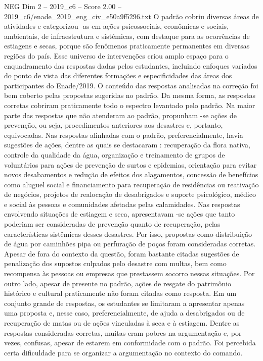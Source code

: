 \begin{textsample}{NEG Dim 2 – 2019\_c6 – Score 2.00 – 2019\_c6/enade\_2019\_eng\_civ\_e50a9f5296.txt}
O padrão cobriu diversas áreas de atividades e categorizou -as em ações psicossociais, econômicas e sociais, ambientais, de infraestrutura e sistêmicas, com destaque para as ocorrências de estiagens e secas, porque são fenômenos praticamente permanentes em diversas regiões do país.
Esse universo de intervenções criou amplo espaço para o enquadramento das respostas dadas pelos estudantes, incluindo enfoques variados do ponto de vista das diferentes formações e especificidades das áreas dos participantes do Enade/2019.
O conteúdo das respostas analisadas na correção foi bem coberto pelas propostas sugeridas no padrão.
Da mesma forma, as respostas corretas cobriram praticamente todo o espectro levantado pelo padrão.
Na maior parte das respostas que não atenderam ao padrão, propunham -se ações de prevenção, ou seja, procedimentos anteriores aos desastres e, portanto, equivocadas.
Nas respostas alinhadas com o padrão, preferencialmente, havia sugestões de ações, dentre as quais se destacaram : recuperação da flora nativa, controle da qualidade da água, organização e treinamento de grupos de voluntários para ações de prevenção de surtos e epidemias, orientação para evitar novos desabamentos e redução de efeitos dos alagamentos, concessão de benefícios como aluguel social e financiamento para recuperação de residências ou reativação de negócios, projetos de realocação de desabrigados e suporte psicológico, médico e social às pessoas e comunidades afetadas pelas calamidades.
Nas respostas envolvendo situações de estiagem e seca, apresentavam -se ações que tanto poderiam ser consideradas de prevenção quanto de recuperação, pelas características sistêmicas desses desastres.
Por isso, propostas como distribuição de água por caminhões pipa ou perfuração de poços foram consideradas corretas.
Apesar de fora do contexto da questão, foram bastante citadas sugestões de penalização dos supostos culpados pelo desastre com multas, bem como recompensa às pessoas ou empresas que prestassem socorro nessas situações.
Por outro lado, apesar de presente no padrão, ações de resgate do patrimônio histórico e cultural praticamente não foram citadas como resposta.
Em um conjunto grande de respostas, os estudantes se limitaram a apresentar apenas uma proposta e, nesse caso, preferencialmente, de ajuda a desabrigados ou de recuperação de matas ou de ações vinculadas à seca e à estiagem.
Dentre as respostas consideradas corretas, muitas eram pobres na argumentação e, por vezes, confusas, apesar de estarem em conformidade com o padrão.
Foi percebida certa dificuldade para se organizar a argumentação no contexto do comando.

\end{textsample}
